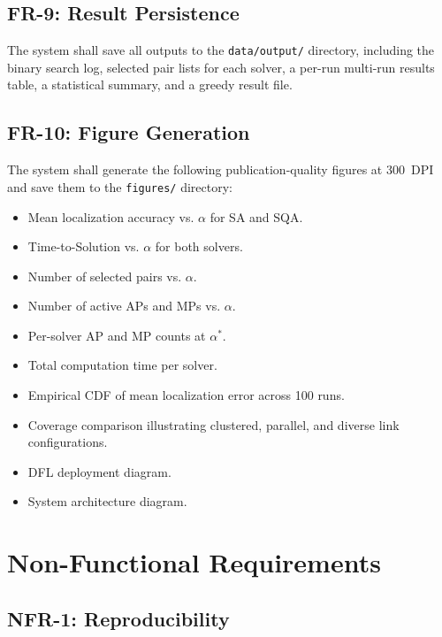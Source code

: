 \documentclass[12pt,a4paper]{article}
\begin{document}
\subsection{FR-9: Result Persistence}

The system shall save all outputs to the \texttt{data/output/} directory,
including the binary search log, selected pair lists for each solver, a
per-run multi-run results table, a statistical summary, and a greedy result
file.

\subsection{FR-10: Figure Generation}

The system shall generate the following publication-quality figures at 300~DPI
and save them to the \texttt{figures/} directory:

\begin{itemize}[leftmargin=2em]
    \item Mean localization accuracy vs. $\alpha$ for SA and SQA.
    \item Time-to-Solution vs. $\alpha$ for both solvers.
    \item Number of selected pairs vs. $\alpha$.
    \item Number of active APs and MPs vs. $\alpha$.
    \item Per-solver AP and MP counts at $\alpha^{*}$.
    \item Total computation time per solver.
    \item Empirical CDF of mean localization error across 100 runs.
    \item Coverage comparison illustrating clustered, parallel, and diverse
          link configurations.
    \item DFL deployment diagram.
    \item System architecture diagram.
\end{itemize}

\section{Non-Functional Requirements}

\subsection{NFR-1: Reproducibility}
\end{document}

